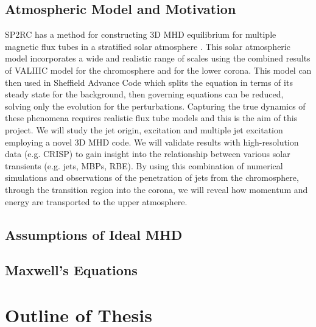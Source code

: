 \documentclass[12pt]{ociamthesis}
\begin{document}
\subsection{Atmospheric Model and Motivation}
SP2RC has a method for constructing 3D MHD equilibrium for multiple magnetic flux tubes in a stratified solar atmosphere \citep{Gent_2013p1,Gent_2014p2}. This solar atmospheric model incorporates a wide and realistic range of scales using the combined results of \cite{Vernazza_1981ApJS}  VALIIIC model for the chromosphere and \cite{McWhirter1975} for the lower corona. This model can then used in Sheffield Advance Code \citep{Griffiths2013} which splits the equation in terms of its steady state for the background, then governing equations can be reduced, solving only the evolution for the perturbations. Capturing the true dynamics of these phenomena requires realistic flux tube models and this is the aim of this project. We will study the jet origin, excitation and multiple jet excitation employing a novel 3D MHD code. We will validate results with high-resolution data (e.g. CRISP) to gain insight into the relationship between various solar transients (e.g. jets, MBPs, RBE). By using this combination of numerical simulations and observations of the penetration of jets from the chromosphere, through the transition region into the corona, we will reveal how momentum and energy are transported to the upper atmosphere.
\subsection{Assumptions of Ideal MHD}
\label{subsec:assumpt}

\subsection{Maxwell's Equations}
\label{subsec:Max}

\section{Outline of Thesis}



  
\end{document}
